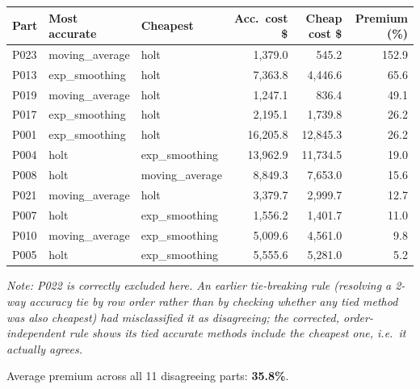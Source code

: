 \documentclass[12pt]{article}
\begin{document}
\begin{center}
\begin{tabular}{@{}lllrrr@{}}
\toprule
\textbf{Part} & \textbf{Most accurate} & \textbf{Cheapest} & \textbf{Acc.\ cost \$} & \textbf{Cheap cost \$} & \textbf{Premium (\%)} \\
\midrule
P023 & moving\_average & holt           & 1{,}379.0  & 545.2     & 152.9 \\
P013 & exp\_smoothing  & holt           & 7{,}363.8  & 4{,}446.6 & 65.6  \\
P019 & moving\_average & holt           & 1{,}247.1  & 836.4     & 49.1  \\
P017 & exp\_smoothing  & holt           & 2{,}195.1  & 1{,}739.8 & 26.2  \\
P001 & exp\_smoothing  & holt           & 16{,}205.8 & 12{,}845.3& 26.2  \\
P004 & holt            & exp\_smoothing & 13{,}962.9 & 11{,}734.5& 19.0  \\
P008 & holt            & moving\_average& 8{,}849.3  & 7{,}653.0 & 15.6  \\
P021 & moving\_average & holt           & 3{,}379.7  & 2{,}999.7 & 12.7  \\
P007 & holt            & exp\_smoothing & 1{,}556.2  & 1{,}401.7 & 11.0  \\
P010 & moving\_average & exp\_smoothing & 5{,}009.6  & 4{,}561.0 & 9.8   \\
P005 & holt            & exp\_smoothing & 5{,}555.6  & 5{,}281.0 & 5.2   \\
\bottomrule
\end{tabular}
\end{center}

\textit{Note: P022 is correctly excluded here. An earlier tie-breaking rule (resolving a
2-way accuracy tie by row order rather than by checking whether any tied method was also
cheapest) had misclassified it as disagreeing; the corrected, order-independent rule shows
its tied accurate methods include the cheapest one, i.e.\ it actually agrees.}

\noindent Average premium across all 11 disagreeing parts: \textbf{35.8\%}.
\end{document}

